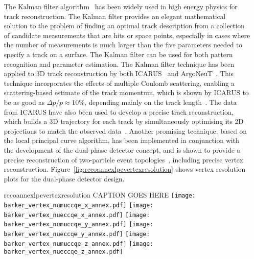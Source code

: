 The Kalman filter algorithm~\cite{kalman} has been widely used in high
energy physics for track reconstruction. The Kalman filter provides an
elegant mathematical solution to the problem of finding an optimal
track description from a collection of candidate measurements that are
hits or space points, especially in cases where the number of
measurements is much larger than the five parameters needed to specify
a track on a surface.  The Kalman filter can be used for both pattern
recognition and parameter estimation.
The Kalman filter technique has been applied
to 3D track reconstruction by both ICARUS~\cite{Ankowski:2006ts} and ArgoNeuT~\cite{REF}.
This technique incorporates the effects of multiple Coulomb scattering,
enabling a scattering-based estimate of the track momentum,
which is shown by ICARUS to be as good as $\Delta p/p \approx 10\%$, 
depending mainly on the track length~\cite{Ankowski:2006ts}.
The data from ICARUS have also been used to develop a precise
track reconstruction, which builds a 3D trajectory for each track by simultaneously
optimising its 2D projections to match the observed data~\cite{Antonello:2012hu}.
Another promising technique, based on the local principal curve algorithm, 
has been implemented in conjunction with the development of the 
dual-phase detector concept, and is shown to provide 
a precise reconstruction of two-particle event topologies~\cite{Back:2013cva,LAGUNA-LBNO-deliv},
including precise vertex reconstruction.
Figure~\ref{fig:recoannexlpcvertexresolution} shows vertex resolution plots for the dual-phase detector design.

\begin{cdrfigure}{recoannexlpcvertexresolution}
{CAPTION GOES HERE}
\texttt{[image: barker\_vertex\_numuccqe\_x\_annex.pdf]}
\texttt{[image: barker\_vertex\_nueccqe\_x\_annex.pdf]}
\texttt{[image: barker\_vertex\_numuccqe\_y\_annex.pdf]}
\texttt{[image: barker\_vertex\_nueccqe\_y\_annex.pdf]}
\texttt{[image: barker\_vertex\_numuccqe\_z\_annex.pdf]}
\texttt{[image: barker\_vertex\_nueccqe\_z\_annex.pdf]}
\end{cdrfigure}



